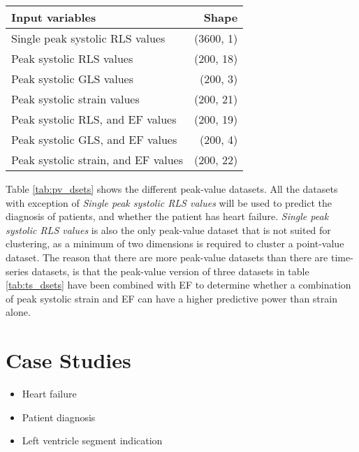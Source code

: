 \begin{table*}[h]
    \centering
    \begin{tabular}{ lr }
        \toprule
        Input variables                     & Shape \\
        \midrule                              
        Single peak systolic RLS values     & (3600, 1) \\
        Peak systolic RLS values            & (200, 18) \\
        Peak systolic GLS values            & (200, 3)  \\
        Peak systolic strain values         & (200, 21) \\
        Peak systolic RLS, and EF values    & (200, 19) \\
        Peak systolic GLS, and EF values    & (200, 4)  \\
        Peak systolic strain, and EF values & (200, 22) \\
        \bottomrule
    \end{tabular}
    \caption{Peak-value datasets. The ''Shape'' parameter is indicates: (Number of objects in the dataset, Number of dimensions of each individual object).}
    \label{tab:pv_dsets}
\end{table*}

Table \ref{tab:pv_dsets} shows the different peak-value datasets. 
All the datasets with exception of \textit{Single peak systolic RLS values} will be used to predict the diagnosis of patients, and whether the patient has heart failure. 
\textit{Single peak systolic RLS values} is also the only peak-value dataset that is not suited for clustering, as a minimum of two dimensions is required to cluster a point-value dataset.
The reason that there are more peak-value datasets than there are time-series datasets, is that the peak-value version of three datasets in table \ref{tab:ts_dsets} have been combined 
with EF to determine whether a combination of peak systolic strain and EF can have a higher predictive power than strain alone.

\section{Case Studies}

\begin{itemize}
    \item Heart failure
    \item Patient diagnosis
    \item Left ventricle segment indication
\end{itemize}

